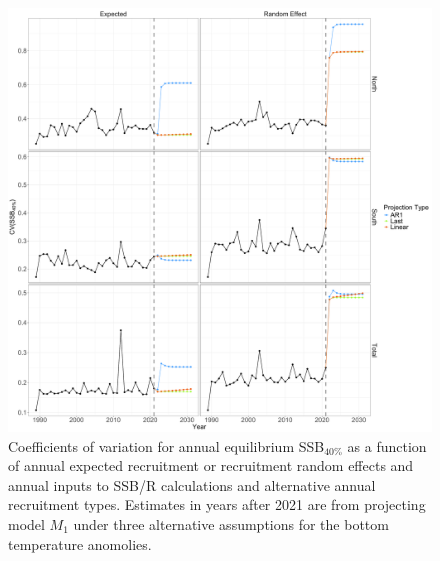 \documentclass[
]{article}
\begin{document}
\begin{figure}

{\centering \includegraphics[height=0.95\textheight]{proj_SSB40_CV} 

}

\caption{Coefficients of variation for annual equilibrium SSB$_{40\%}$ as a function of annual expected recruitment or recruitment random effects and annual inputs to SSB/R calculations and alternative annual recruitment types. Estimates in years after 2021 are from projecting model $M_1$ under three alternative assumptions for the bottom temperature anomolies.}\label{fig:annual-SSB40-cvs}
\end{figure}
\end{document}
